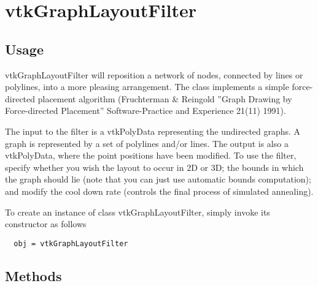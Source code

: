 \section{vtkGraphLayoutFilter}

\subsection{Usage}

 vtkGraphLayoutFilter will reposition a network of nodes, connected by
 lines or polylines, into a more pleasing arrangement. The class 
 implements a simple force-directed placement algorithm 
 (Fruchterman \& Reingold ''Graph Drawing by Force-directed Placement'' 
 Software-Practice and Experience 21(11) 1991).

 The input to the filter is a vtkPolyData representing the undirected 
 graphs. A graph is represented by a set of polylines and/or lines. 
 The output is also a vtkPolyData, where the point positions have been 
 modified. To use the filter, specify whether you wish the layout to 
 occur in 2D or 3D; the bounds in which the graph should lie (note that you
 can just use automatic bounds computation); and modify the cool down
 rate (controls the final process of simulated annealing).

To create an instance of class vtkGraphLayoutFilter, simply
invoke its constructor as follows
\begin{verbatim}
  obj = vtkGraphLayoutFilter
\end{verbatim}
\subsection{Methods}


